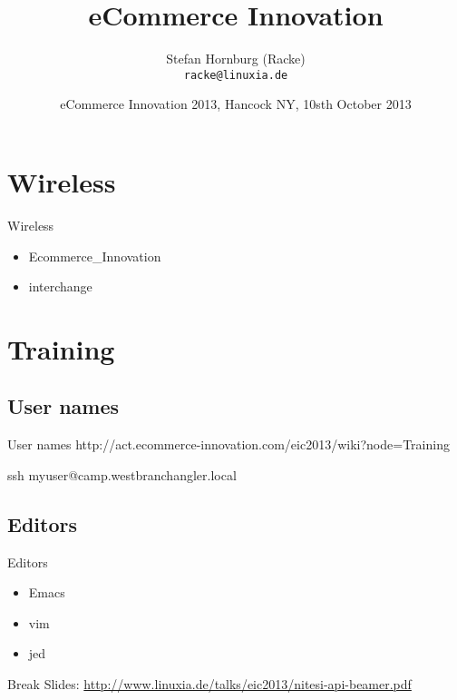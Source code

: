 \usepackage[utf8]{inputenc}
\usepackage[T1]{fontenc}
\usepackage{mathptmx}
\usepackage[scaled=.90]{helvet}
\usepackage{courier}
\usepackage{caption}
\captionsetup{labelformat=empty,labelsep=none}
\usepackage{beamerthemesplit}
\usepackage{verbatim}
\usepackage{hyperref}
\usepackage{listings}
\lstset{language=Perl,basicstyle=\normalsize,tabsize=3,showstringspaces=false}

\title{eCommerce Innovation}
\author[racke]{Stefan Hornburg (Racke)\\ \texttt{racke@linuxia.de}}
\date{eCommerce Innovation 2013, Hancock NY, 10sth October 2013}


\maketitle{}

\begin{frame}
  \titlepage
\end{frame}

\tableofcontents

\section{Wireless}

\begin{frame}[fragile]{Wireless}
\begin{itemize}
\item Ecommerce\_Innovation
\item interchange
\end{itemize}
\end{frame}

\section{Training}

\subsection{User names}
\begin{frame}[fragile]{User names}
http://act.ecommerce-innovation.com/eic2013/wiki?node=Training

ssh myuser@camp.westbranchangler.local
\end{frame}

\subsection{Editors}
\begin{frame}{Editors}
\begin{itemize}
\item Emacs
\item vim
\item jed
\end{itemize}
\end{frame}

\begin{frame}{Break}
Slides:
\url{http://www.linuxia.de/talks/eic2013/nitesi-api-beamer.pdf}
\end{frame}



